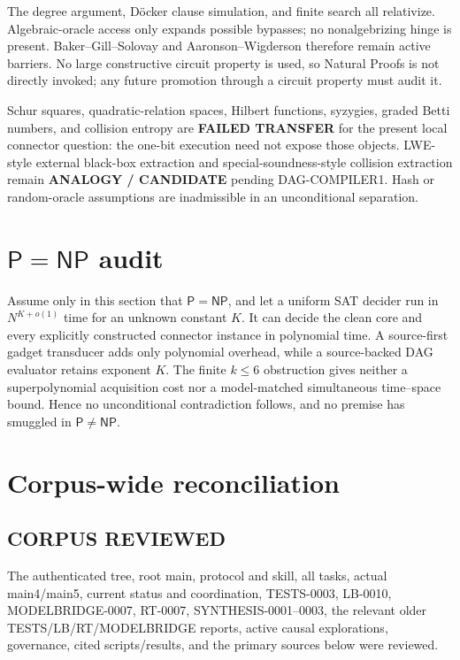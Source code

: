 \documentclass[11pt]{article}
\begin{document}
The degree argument, D\"ocker clause simulation, and finite search all
relativize.  Algebraic-oracle access only expands possible bypasses; no
nonalgebrizing hinge is present.  Baker--Gill--Solovay and
Aaronson--Wigderson therefore remain active barriers.  No large constructive
circuit property is used, so Natural Proofs is not directly invoked; any
future promotion through a circuit property must audit it.

Schur squares, quadratic-relation spaces, Hilbert functions, syzygies,
graded Betti numbers, and collision entropy are \textbf{FAILED TRANSFER} for
the present local connector question: the one-bit execution need not expose
those objects.  LWE-style external black-box extraction and
special-soundness-style collision extraction remain
\textbf{ANALOGY / CANDIDATE} pending DAG-COMPILER1.  Hash or random-oracle
assumptions are inadmissible in an unconditional separation.

\section{$\mathsf P=\mathsf{NP}$ audit}

Assume only in this section that $\mathsf P=\mathsf{NP}$, and let a uniform
SAT decider run in $N^{K+o(1)}$ time for an unknown constant $K$.  It can
decide the clean core and every explicitly constructed connector instance in
polynomial time.  A source-first gadget transducer adds only polynomial
overhead, while a source-backed DAG evaluator retains exponent $K$.  The
finite $k\le6$ obstruction gives neither a superpolynomial acquisition cost
nor a model-matched simultaneous time--space bound.  Hence no unconditional
contradiction follows, and no premise has smuggled in $\mathsf P\ne\mathsf{NP}$.

\section{Corpus-wide reconciliation}

\subsection*{CORPUS REVIEWED}
The authenticated tree, root main, protocol and skill, all tasks, actual
main4/main5, current status and coordination, TESTS-0003, LB-0010,
MODELBRIDGE-0007, RT-0007, SYNTHESIS-0001--0003, the relevant older
TESTS/LB/RT/MODELBRIDGE reports, active causal explorations, governance,
cited scripts/results, and the primary sources below were reviewed.
\end{document}
